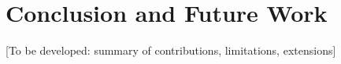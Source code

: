 \chapter{Conclusion and Future Work}
\label{chap:conclusion}

[To be developed: summary of contributions, limitations, extensions]